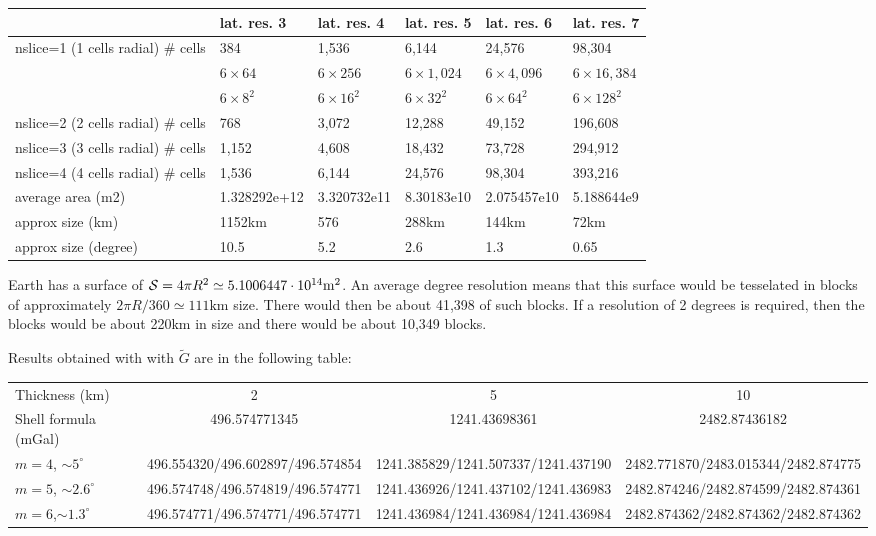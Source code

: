 \begin{center}
\begin{tabular}{llllll}
\hline
         & lat. res. 3 & lat. res. 4 & lat. res. 5 & lat. res. 6 & lat. res. 7 \\ 
\hline
\hline
nslice=1 (1 cells radial) \# cells & 384   & 1,536 & 6,144  & 24,576 & 98,304  \\
           & $6\times64$  & $6\times256$ & $6\times1,024$ & $6\times4,096$ & $6\times16,384$ \\
           & $6\times8^2$  & $6\times16^2$ & $6\times32^2$ & $6\times64^2$ & $6\times128^2$ \\
nslice=2 (2 cells radial) \# cells & 768   & 3,072 & 12,288 & 49,152 & 196,608 \\
nslice=3 (3 cells radial) \# cells & 1,152 & 4,608 & 18,432 & 73,728 & 294,912 \\
nslice=4 (4 cells radial) \# cells & 1,536 & 6,144 & 24,576 & 98,304 & 393,216 \\
\hline
average area   (m2)   &  1.328292e+12 & 3.320732e11 & 8.30183e10 & 2.075457e10 & 5.188644e9 \\ 
approx size    (km)          &  1152km   & 576  & 288km & 144km  & 72km \\ 
approx size    (degree)      &  10.5 & 5.2 & 2.6 & 1.3 & 0.65 \\
\hline 
\end{tabular}
\end{center}

Earth has a surface of ${\cal S}=4\pi R^2\simeq 5.1006447\cdot 10^{14} \si{\square\meter}$. 
An average degree resolution means that this surface would be tesselated in blocks of 
approximately $2\pi R/ 360 \simeq 111\si{\kilo\metre}$ size. There would then be about 41,398 of such blocks. 
If a resolution of 2 degrees is required, then the blocks would be about 220km in size and 
there would be about 10,349 blocks. 

Results obtained with \aspect{} with $\tilde{G}$ are in the following table:

\noindent
\begin{tiny}
\begin{tabular}{|l|c|c|c|}
\hline
Thickness (km)  & 2   & 5  & 10 \\
Shell formula (mGal)  &  496.574771345 & 1241.43698361 & 2482.87436182 \\ 
\hline
$m=4$, $\sim{}5^\circ$   &  
496.554320/496.602897/496.574854 &
1241.385829/1241.507337/1241.437190 &
2482.771870/2483.015344/2482.874775 \\
$m=5$, $\sim{}2.6^\circ$ & 
496.574748/496.574819/496.574771 &
1241.436926/1241.437102/1241.436983 &
2482.874246/2482.874599/2482.874361 \\
$m=6$,$\sim{}1.3^\circ$  & 
496.574771/496.574771/496.574771 &
1241.436984/1241.436984/1241.436984 &
2482.874362/2482.874362/2482.874362 \\
\hline
\end{tabular}
\end{tiny}



